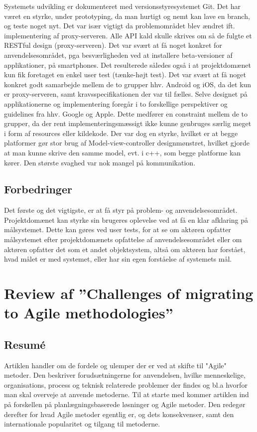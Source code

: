 \documentclass[12pt]{article}
\begin{document}
Systemets udvikling er dokumenteret med versionsstyresystemet Git. Det har været en styrke, under prototyping, da man hurtigt og nemt kan lave en branch, og teste noget nyt. Det var især vigtigt da problemområdet blev ændret ift. implementering af proxy-serveren. Alle API kald skulle skrives om så de fulgte et RESTful design (proxy-serveren). Det var svært at få noget konkret for anvendelsesområdet, pga besværligheden ved at installere beta-versioner af applikationer, på smartphones. Det resulterede således også i at projektdomænet kun fik foretaget en enkel user test (tænke-højt test). Det var svært at få noget konkret godt samarbejde mellem de to grupper hhv. Android og iOS, da det kun er proxy-serveren, samt kravsspecifikationen der var til fælles. Selve designet på applikationerne og implementering foregår i to forskellige perspektiver og guidelines fra hhv. Google og Apple. Dette medfører en constraint mellem de to grupper, da der rent implementeringsmæssigt ikke kunne genbruges særlig meget i form af resources eller kildekode. Der var dog en styrke, hvilket er at begge platformer gør stor brug af Model-view-controller designmønstret, hvilket gjorde at man kunne skrive den samme model, evt. i c++, som begge platforme kan kører. Den største svaghed var nok mangel på kommunikation.

\subsection {Forbedringer}
Det første og det vigtigste, er at få styr på problem- og anvendelsesområdet. Projektdomænet kan styrke sin brugeres oplevelse ved at få en klar afklaring på målsystemet. Dette kan gøres ved user tests, for at se om aktøren opfatter målsystemet efter projektdomænets opfattelse af anvendelsesområdet eller om aktøren opfatter det som et andet objektsystem, altså om aktøren har forstået, hvad målet er med systemet, eller har sin egen forståelse af systemets mål. 

\section {Review af ''Challenges of migrating to Agile methodologies'' \cite{articel} }

\subsection{Resumé}

Artiklen handler om de fordele og ulemper der er ved at skifte til "Agile" metoder. Den beskriver forudsætningerne for anvendelsen, hvilke menneskelige, organisations, process og teknisk relaterede problemer der findes og bl.a hvorfor man skal overveje at anvende metoderne. Til at starte med kommer artiklen ind på forskellen på planlægningsbaserede løsninger og Agile metoder. Den redegør derefter for hvad Agile metoder egentlig er, og dets konsekvenser, samt den internationale popularitet og tilgang til metoderne.
\end{document}
